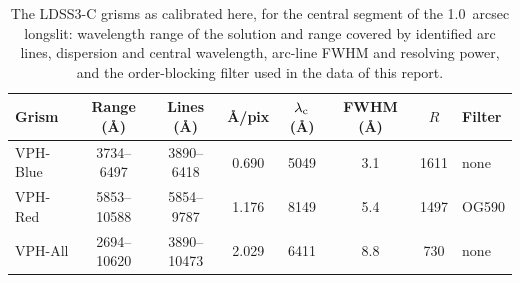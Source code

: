 \begin{table}[htb]
  \centering\small
  \caption{The LDSS3-C grisms as calibrated here, for the central segment of the
    \SI{1.0}{arcsec} longslit: wavelength range of the solution and range covered
    by identified arc lines, dispersion and central wavelength, arc-line FWHM and
    resolving power, and the order-blocking filter used in the data of this
    report.}
  \label{tab:grisms}
  \begin{tabular}{lccccccl}
    \toprule
    Grism & Range (\AA) & Lines (\AA) & \AA/pix & $\lambda_{\rm c}$ (\AA) & FWHM (\AA) & $R$ & Filter \\
    \midrule
    VPH-Blue & 3734--6497 & 3890--6418 & 0.690 & 5049 & 3.1 & 1611 & none \\
    VPH-Red & 5853--10588 & 5854--9787 & 1.176 & 8149 & 5.4 & 1497 & OG590 \\
    VPH-All & 2694--10620 & 3890--10473 & 2.029 & 6411 & 8.8 & 730 & none \\
    \bottomrule
  \end{tabular}
\end{table}
